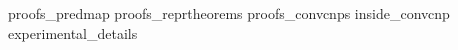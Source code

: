 \documentclass[12pt]{report}
\begin{document}
{proofs_predmap}
{proofs_reprtheorems}
{proofs_convcnps}
{inside_convcnp}
{experimental_details}
\end{document}
